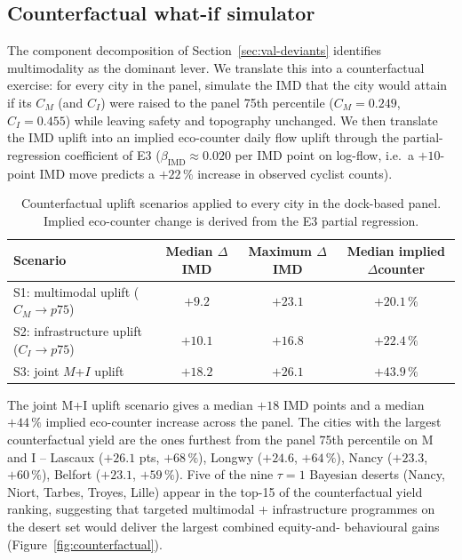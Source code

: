 \documentclass[11pt,a4paper]{article}
\newcommand{\IMD}{\mathrm{IMD}}
\begin{document}
\subsection{Counterfactual what-if simulator}
\label{sec:val-counterfactual}

The component decomposition of Section~\ref{sec:val-deviants}
identifies multimodality as the dominant lever. We translate this
into a counterfactual exercise: for every city in the panel,
simulate the IMD that the city would attain if its $C_M$ (and
$C_I$) were raised to the panel 75th percentile ($C_M = 0.249$,
$C_I = 0.455$) while leaving safety and topography unchanged. We
then translate the IMD uplift into an implied eco-counter daily
flow uplift through the partial-regression coefficient of E3
($\beta_{\IMD} \approx 0.020$ per IMD point on log-flow, i.e.\ a
$+10$-point IMD move predicts a $+22\,\%$ increase in observed
cyclist counts).

\begin{table}[H]
\centering
\caption{Counterfactual uplift scenarios applied to every city in
the dock-based panel. Implied eco-counter change is derived from
the E3 partial regression.}
\label{tab:counterfactual}
\small
\begin{tabular}{@{}lccc@{}}
\toprule
Scenario & Median $\Delta$IMD & Maximum $\Delta$IMD & Median implied
$\Delta$counter \\
\midrule
S1: multimodal uplift ($C_M \to p75$)        & $+9.2$  & $+23.1$ & $+20.1\,\%$ \\
S2: infrastructure uplift ($C_I \to p75$)    & $+10.1$ & $+16.8$ & $+22.4\,\%$ \\
S3: joint $M$+$I$ uplift                     & $+18.2$ & $+26.1$ & $+43.9\,\%$ \\
\bottomrule
\end{tabular}
\end{table}

The joint M+I uplift scenario gives a median $+18$ IMD points and
a median $+44\,\%$ implied eco-counter increase across the panel.
The cities with the largest counterfactual yield are the ones
furthest from the panel 75th percentile on M and I -- Lascaux
($+26.1$ pts, $+68\,\%$), Longwy ($+24.6$, $+64\,\%$), Nancy
($+23.3$, $+60\,\%$), Belfort ($+23.1$, $+59\,\%$). Five of the
nine $\tau = 1$ Bayesian deserts (Nancy, Niort, Tarbes, Troyes,
Lille) appear in the top-15 of the counterfactual yield ranking,
suggesting that targeted multimodal + infrastructure programmes
on the desert set would deliver the largest combined equity-and-
behavioural gains (Figure~\ref{fig:counterfactual}).
\end{document}
